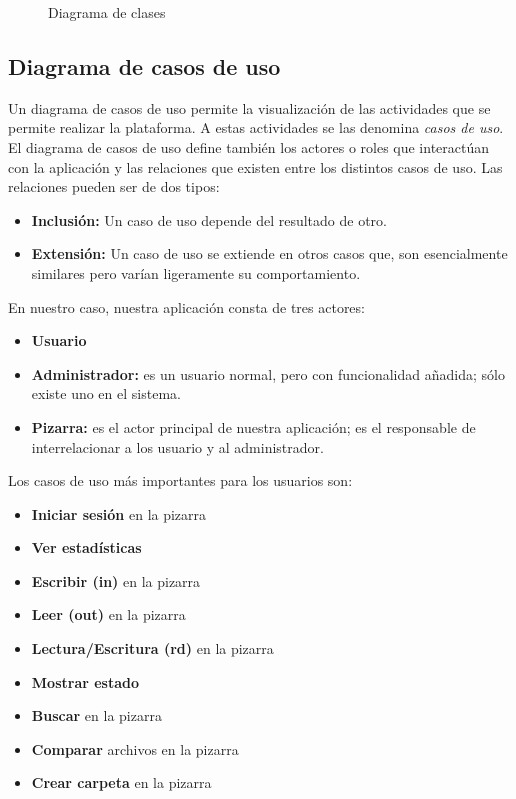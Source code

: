 \begin{landscape}
\begin{figure}[!h]
\centering
\clases
\caption{Diagrama de clases}
\end{figure}
\end{landscape}

\subsection{Diagrama de casos de uso}
Un diagrama de casos de uso permite la visualización de las actividades que se permite realizar la plataforma. A estas actividades se las denomina \textit{casos de uso}. El diagrama de casos de uso define también los actores o roles que interactúan con la aplicación y las relaciones que existen entre los distintos casos de uso. Las relaciones pueden ser de dos tipos:

\begin{itemize}
	\item \textbf{Inclusión:} Un caso de uso depende del resultado de otro.
	\item \textbf{Extensión:} Un caso de uso se extiende en otros casos que, son esencialmente similares pero varían ligeramente su comportamiento.
\end{itemize}

En nuestro caso, nuestra aplicación consta de tres actores:
\begin{itemize}
\item \textbf{Usuario}
\item \textbf{Administrador:} es un usuario normal, pero con funcionalidad añadida; sólo existe uno en el sistema.
\item \textbf{Pizarra:} es el actor principal de nuestra aplicación; es el responsable de interrelacionar a los usuario y al administrador.   
\end{itemize}

Los casos de uso más importantes para los usuarios son:
\begin{itemize}
\item \textbf{Iniciar sesión} en la pizarra
\item \textbf{Ver estadísticas} 
\item \textbf{Escribir (in)} en la pizarra
\item \textbf{Leer (out)} en la pizarra
\item \textbf{Lectura/Escritura (rd)} en la pizarra
\item \textbf{Mostrar estado}
\item \textbf{Buscar} en la pizarra
\item \textbf{Comparar} archivos en la pizarra
\item \textbf{Crear carpeta} en la pizarra
\end{itemize}

